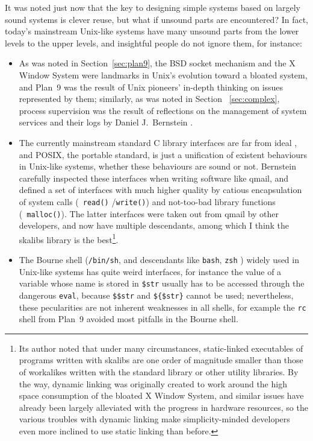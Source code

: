 It was noted just now that the key to designing simple systems based on
largely sound systems is clever reuse, but what if unsound parts are
encountered?  In fact, today's mainstream Unix-like systems have
many unsound parts from the lower levels to the upper levels,
and insightful people do not ignore them, for instance:
\begin{itemize}
\item As was noted in Section~\ref{sec:plan9}, the BSD socket mechanism and
	the X Window System were landmarks in Unix's evolution toward a bloated
	system, and Plan~9 was the result of Unix pioneers' in-depth thinking
	on issues represented by them; similarly, as was noted in Section~%
	\ref{sec:complex}, process supervision was the result of reflections on the
	management of system services and their logs by Daniel J.\ Bernstein \etal.
\item The currently mainstream standard C library interfaces are far from ideal%
	, and POSIX, the portable standard, is just a
	unification of existent behaviours in Unix-like systems, whether these
	behaviours are sound or not.  Bernstein carefully inspected these interfaces
	when writing software like qmail, and defined a set of interfaces with much
	higher quality by catious encapsulation of system calls (\eg~\verb|read()|%
	/\verb|write()|) and not-too-bad library functions (\eg~\verb|malloc()|).
	The latter interfaces were taken out from qmail \etc{} by other developers,
	and now have multiple descendants, among which I think the skalibs library
	is the best\footnote{Its author noted that under
	many circumstances, static-linked executables of programs written with
	skalibs are one order of magnitude smaller than those of workalikes
	written with the standard library or other utility libraries.  By the way,
	dynamic linking was originally created to work around the high space
	consumption of the bloated X Window System, and similar issues have
	already been largely alleviated with the progress in hardware
	resources, so the various troubles with dynamic linking make
	simplicity-minded developers even more inclined to use static
	linking than before.}.
\item The Bourne shell (\verb|/bin/sh|, and descendants like \verb|bash|,
	\verb|zsh| \etc) widely used in Unix-like systems has quite weird
	interfaces, for instance the value of a variable
	whose name is stored in \verb|$str| usually has to be accessed
	through the dangerous \verb|eval|, because \verb|$$str| and \verb|${$str}|
	cannot be used; nevertheless, these pecularities are not inherent
	weaknesses in all shells, for example the \verb|rc| shell from Plan~9
	avoided most pitfalls in the Bourne shell.
\end{itemize}
